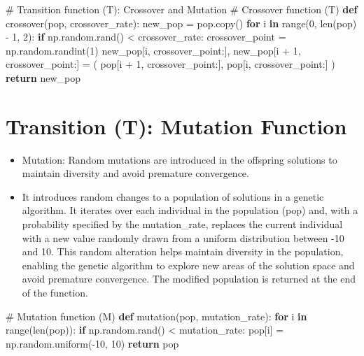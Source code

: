 \documentclass[
  letterpaper,
  DIV=11,
  numbers=noendperiod]{scrreprt}
\newenvironment{Shaded}{\begin{snugshade}}{\end{snugshade}}
\newcommand{\BuiltInTok}[1]{\textcolor[rgb]{0.00,0.23,0.31}{#1}}
\newcommand{\CommentTok}[1]{\textcolor[rgb]{0.37,0.37,0.37}{#1}}
\newcommand{\ControlFlowTok}[1]{\textcolor[rgb]{0.00,0.23,0.31}{\textbf{#1}}}
\newcommand{\DecValTok}[1]{\textcolor[rgb]{0.68,0.00,0.00}{#1}}
\newcommand{\KeywordTok}[1]{\textcolor[rgb]{0.00,0.23,0.31}{\textbf{#1}}}
\newcommand{\NormalTok}[1]{\textcolor[rgb]{0.00,0.23,0.31}{#1}}
\newcommand{\OperatorTok}[1]{\textcolor[rgb]{0.37,0.37,0.37}{#1}}
\providecommand{\tightlist}{%
  \setlength{\itemsep}{0pt}\setlength{\parskip}{0pt}}\usepackage{longtable,booktabs,array}
\begin{document}
\begin{Shaded}
\begin{Highlighting}[]
\CommentTok{\# Transition function (T): Crossover and Mutation}
\CommentTok{\# Crossover function (T)}
\KeywordTok{def}\NormalTok{ crossover(pop, crossover\_rate):}
\NormalTok{    new\_pop }\OperatorTok{=}\NormalTok{ pop.copy()}
    \ControlFlowTok{for}\NormalTok{ i }\KeywordTok{in} \BuiltInTok{range}\NormalTok{(}\DecValTok{0}\NormalTok{, }\BuiltInTok{len}\NormalTok{(pop) }\OperatorTok{{-}} \DecValTok{1}\NormalTok{, }\DecValTok{2}\NormalTok{):}
        \ControlFlowTok{if}\NormalTok{ np.random.rand() }\OperatorTok{\textless{}}\NormalTok{ crossover\_rate:}
\NormalTok{            crossover\_point }\OperatorTok{=}\NormalTok{ np.random.randint(}\DecValTok{1}\NormalTok{)}
\NormalTok{            new\_pop[i, crossover\_point:], new\_pop[i }\OperatorTok{+} \DecValTok{1}\NormalTok{, crossover\_point:] }\OperatorTok{=}\NormalTok{ (}
\NormalTok{                pop[i }\OperatorTok{+} \DecValTok{1}\NormalTok{, crossover\_point:], }
\NormalTok{                pop[i, crossover\_point:]}
\NormalTok{            )}
    \ControlFlowTok{return}\NormalTok{ new\_pop}
\end{Highlighting}
\end{Shaded}

\section{Transition (T): Mutation
Function}\label{transition-t-mutation-function}

\begin{itemize}
\tightlist
\item
  Mutation: Random mutations are introduced in the offspring solutions
  to maintain diversity and avoid premature convergence.
\item
  It introduces random changes to a population of solutions in a genetic
  algorithm. It iterates over each individual in the population (pop)
  and, with a probability specified by the mutation\_rate, replaces the
  current individual with a new value randomly drawn from a uniform
  distribution between -10 and 10. This random alteration helps maintain
  diversity in the population, enabling the genetic algorithm to explore
  new areas of the solution space and avoid premature convergence. The
  modified population is returned at the end of the function.
\end{itemize}

\begin{Shaded}
\begin{Highlighting}[]
\CommentTok{\# Mutation function (M)}
\KeywordTok{def}\NormalTok{ mutation(pop, mutation\_rate):}
    \ControlFlowTok{for}\NormalTok{ i }\KeywordTok{in} \BuiltInTok{range}\NormalTok{(}\BuiltInTok{len}\NormalTok{(pop)):}
        \ControlFlowTok{if}\NormalTok{ np.random.rand() }\OperatorTok{\textless{}}\NormalTok{ mutation\_rate:}
\NormalTok{            pop[i] }\OperatorTok{=}\NormalTok{ np.random.uniform(}\OperatorTok{{-}}\DecValTok{10}\NormalTok{, }\DecValTok{10}\NormalTok{)}
    \ControlFlowTok{return}\NormalTok{ pop}
\end{Highlighting}
\end{Shaded}
\end{document}
